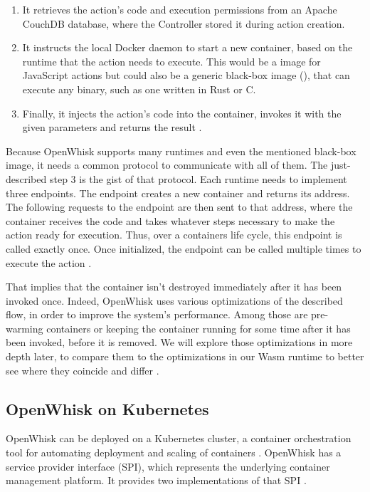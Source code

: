 \begin{enumerate}
    \item It retrieves the action's code and execution permissions from an Apache CouchDB database, where the Controller stored it during action creation. 
    \item It instructs the local Docker daemon to start a new container, based on the runtime that the action needs to execute. This would be a  image for JavaScript actions but could also be a generic black-box image (), that can execute any binary, such as one written in Rust or C.
    \item Finally, it injects the action's code into the container, invokes it with the given parameters and returns the result \cite{OpenWhiskSystemDesign}.
\end{enumerate}

Because OpenWhisk supports many runtimes and even the mentioned black-box image, it needs a common protocol to communicate with all of them. The just-described step 3 is the gist of that protocol. Each runtime needs to implement three endpoints. The  endpoint creates a new container and returns its address. The following requests to the  endpoint are then sent to that address, where the container receives the code and takes whatever steps necessary to make the action ready for execution. Thus, over a containers life cycle, this endpoint is called exactly once. Once initialized, the  endpoint can be called multiple times to execute the action \cite{OpenWhiskSystemDesign}.

That implies that the container isn't destroyed immediately after it has been invoked once. Indeed, OpenWhisk uses various optimizations of the described flow, in order to improve the system's performance. Among those are pre-warming containers or keeping the container running for some time after it has been invoked, before it is removed.
We will explore those optimizations in more depth later, to compare them to the optimizations in our Wasm runtime to better see where they coincide and differ \cite{OpenWhiskSystemDesign}.

\subsection{OpenWhisk on Kubernetes}

OpenWhisk can be deployed on a Kubernetes cluster, a container orchestration tool for automating deployment and scaling of containers \cite{Kub2021}. OpenWhisk has a  service provider interface (SPI), which represents the underlying container management platform. It provides two implementations of that SPI \cite{OWKub2020}.

